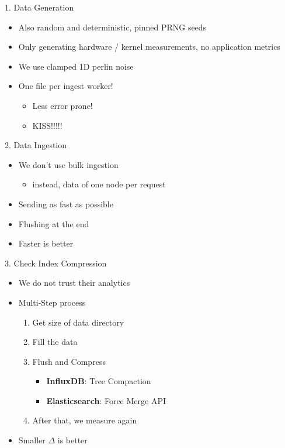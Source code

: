 \documentclass[compress,aspectratio=169]{beamer}
\begin{document}
\begin{frame}{1. Data Generation}
\begin{itemize}
  \item Also random and deterministic, pinned PRNG seeds
  \item Only generating hardware / kernel measurements, no application metrics
  \item We use clamped 1D perlin noise
  \item One file per ingest worker!
  \begin{itemize}
    \item Less error prone!
    \item KISS!!!!!
  \end{itemize}
\end{itemize}
\end{frame}

\begin{frame}{2. Data Ingestion}
\begin{itemize}
  \item We don't use bulk ingestion
  \begin{itemize}
    \item instead, data of one node per request
  \end{itemize}
  \item Sending as fast as possible
  \item Flushing at the end
  \item Faster is better
\end{itemize}
\end{frame}

\begin{frame}{3. Check Index Compression}
  \begin{itemize}
    \item We do not trust their analytics
    \item Multi-Step process
    \begin{enumerate}
      \item Get size of data directory
      \item Fill the data
      \item Flush and Compress
      \begin{itemize}
        \item \textbf{InfluxDB}: Tree Compaction
        \item \textbf{Elasticsearch}: Force Merge API
      \end{itemize}
      \item After that, we measure again
    \end{enumerate}
    \item Smaller $\Delta$ is better
  \end{itemize}
\end{frame}
\end{document}
